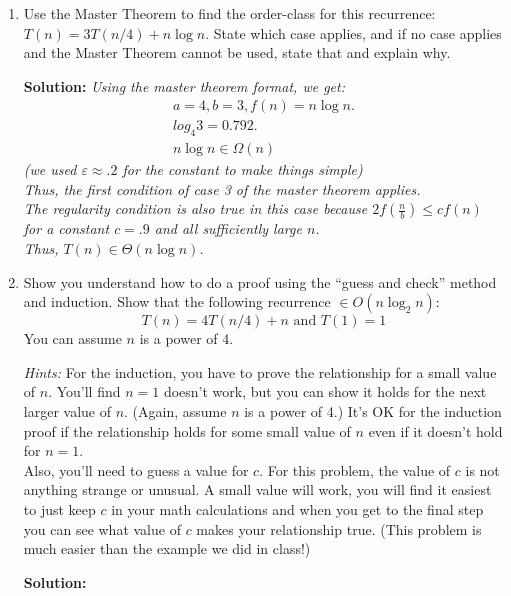\documentclass[10pt]{article}
\begin{document}
\begin{enumerate}
    	\item Use the Master Theorem to find the order-class for this recurrence: $T(n) = 3 T (n/4) + n \log n$.  State which case applies, and if no case applies and the Master Theorem cannot be used, state that and explain why.
    	
    	\textbf{Solution:} 
    	\emph{
    	Using the master theorem format, we get:
    	\begin{align*}
    	    a = 4, b = 3, f(n) = n \log n. \\
    	    log_4{3} = 0.792. \\
    	    n\log{n} \in \Omega(n)
    	 \end{align*}
    	 (we used $\varepsilon \approx .2$ for the constant to make things simple) \\
    	 Thus, the first condition of case 3 of the master theorem applies. \\ 
    	 The regularity condition is also true in this case because $2f\left(\frac{n}{b}\right) \leq cf(n)$ for a constant $c = .9$ and all sufficiently large $n$. \\
    	 Thus, $T(n) \in \Theta(n\log{n})$.
    	}
    	
    	\pagebreak
    	
    	\item Show you understand how to do a proof using the ``guess and check'' method and induction.   Show that the following recurrence $\in O(n \log_2 n)$:
    	$$T(n) = 4 T(n/4) + n \textrm{ and } T(1) = 1$$ 
    	You can assume $n$ is a power of 4.
    	
    	\emph{Hints:} For the induction, you have to prove the relationship for a small value of $n$.  You'll find $n=1$ doesn't work, but you can show it holds for the
    	next larger value of $n$.  (Again, assume $n$ is a power of 4.) It's OK for the induction proof if the relationship holds for some small value of $n$ even
    	if it doesn't hold for $n=1$.\\
    	Also, you'll need to guess a value for $c$. For this problem, the value of $c$ is not anything strange or unusual.  A small value will work, you will find it easiest to just keep $c$ in your math calculations and when you get to the final step you can see what value of $c$ makes your relationship true. 
    	(This problem is much easier than the example we did in class!) 
    	
    	\textbf{Solution:}
    	

\end{enumerate}
\end{document}
